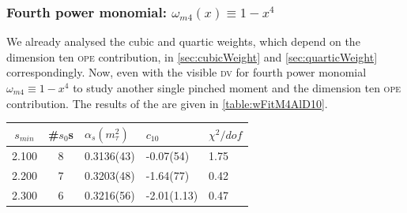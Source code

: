 \documentclass[../../index.tex]{subfiles}
\begin{document}
\subsubsection{Fourth power monomial: \(\omega_{m4}(x) \equiv 1-x^4\)}
We already analysed the cubic and quartic weights, which depend on the dimension
ten \textsc{ope} contribution, in \cref{sec:cubicWeight} and
\cref{sec:quarticWeight} correspondingly. Now, even with the visible \textsc{dv}
for fourth power monomial \(\omega_{m4}\equiv 1-x^4\) to study another single
pinched moment and the dimension ten \textsc{ope} contribution. The results of
the are given in \cref{table:wFitM4AlD10}.
\begin{table}
  \centering
  \begin{tabularx}{\textwidth}{ccYYY}
    \toprule
    \(s_{min}\) & \#\(s_0\)s & \(\alpha_s(m_\tau^2)\) & \(c_{10}\) & \(\chi^2/dof\)  \\
    \midrule
    2.100 & 8  & 0.3136(43) & -0.07(54) & 1.75 \\
    2.200 & 7  & 0.3203(48) & -1.64(77) & 0.42 \\
    2.300 & 6  & 0.3216(56) & -2.01(1.13) & 0.47 \\

\end{tabularx}
\end{table}
\end{document}
